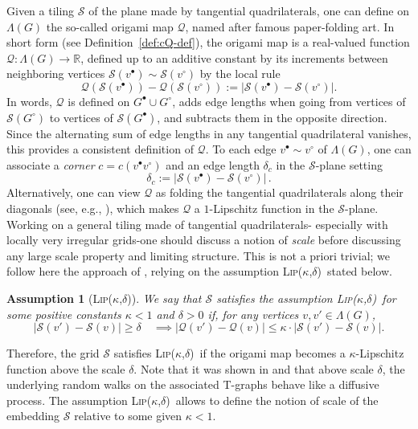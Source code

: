 \documentclass[reqno]{amsart}
\numberwithin{equation}{section}
\newtheorem{assumpintro}{Assumption}[section]
\theoremstyle{definition}
\theoremstyle{remark}
\newcommand\cQ{\mathcal{Q}}
\newcommand\cS{\mathcal{S}}
\def\LipKd{{\mbox{\textsc{Lip(}$\kappa$\textsc{,}$\delta$\textsc{)}}}}
\begin{document}
Given a tiling $\cS$ of the plane made by tangential quadrilaterals, one can define on $\Lambda(G)$ the so-called origami map $\cQ$, named after famous paper-folding art. In short form (see Definition~\ref{def:cQ-def}), the origami map is a real-valued function $\cQ:\Lambda(G)\to\mathbb{R}$, defined up to an additive constant by its increments between neighboring vertices $\cS(v^\bullet)\sim\cS(v^\circ)$ by the local rule
\begin{equation}\nonumber
	\cQ(\cS(v^\bullet))-\cQ(\cS(v^\circ)) := |\cS(v^\bullet)-\cS(v^\circ)|.
\end{equation}
In words, $\cQ$ is defined on $G^{\bullet}\cup G^{\circ}$, adds edge lengths when going from vertices of $\cS(G^{\circ})$ to vertices of $\cS(G^{\bullet})$, and subtracts them in the opposite direction. Since the alternating sum of edge lengths in any tangential quadrilateral vanishes, this provides a consistent definition of $\cQ$. To each edge $v^\bullet\sim v^\circ$ of $\Lambda(G)$, one can associate a \emph{corner} $c=c(v^\bullet v^\circ)$ and an edge length $\delta_c$ in the $\cS$-plane setting
\[
\delta_c:=|\cS(v^\bullet)-\cS(v^\circ)|\,.
\]
Alternatively, one can view $\cQ$ as folding the tangential quadrilaterals along their diagonals (see, e.g., \cite[Section 8.2]{CLR1}), which makes $\cQ$ a $1$-Lipschitz function in the $\cS$-plane.
Working on a general tiling made of tangential quadrilaterals- especially with locally very irregular grids-one should discuss a notion of \emph{scale} before discussing any large scale property and limiting structure. This is not a priori trivial; we follow here the approach of \cite{CLR1}, relying on the assumption \LipKd\ stated below.
\begin{assumpintro}[\LipKd]
We say that $\cS$ satisfies the assumption \LipKd\ for some positive constants $\kappa<1$ and $\delta>0$ if, for any vertices $v,v'\in \Lambda(G)$,
\begin{equation}
\label{eq:LipKd}
 |\cS (v')-\cS (v)|\ge\delta \quad \implies |\cQ(v')-\cQ(v)|\le\kappa\cdot |\cS(v')-\cS (v)|.
\end{equation}
\end{assumpintro}
Therefore, the grid $\cS$ satisfies \LipKd\ if the origami map becomes a $\kappa$-Lipschitz function above the scale $\delta$. Note that it was shown in \cite{CLR1} and \cite[Section 5]{BCLR} that above scale $\delta$, the underlying random walks on the associated T-graphs behave like a diffusive process. The assumption \LipKd\ allows to define the notion of scale of the embedding $\cS$ relative to some given $\kappa<1 $.
\end{document}
